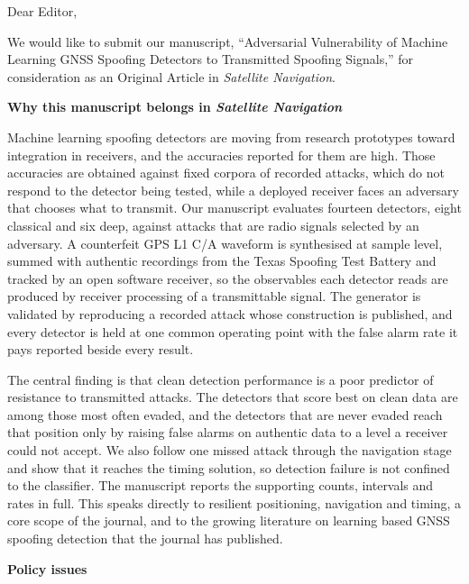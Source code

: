 \documentclass[11pt]{article}
\begin{document}
\noindent Dear Editor,

\vspace{1em}

\noindent We would like to submit our manuscript, ``Adversarial Vulnerability of Machine
Learning GNSS Spoofing Detectors to Transmitted Spoofing Signals,'' for consideration as an
Original Article in \emph{Satellite Navigation}.

\vspace{1em}
\noindent\textbf{Why this manuscript belongs in \emph{Satellite Navigation}}

\vspace{0.5em}

\noindent Machine learning spoofing detectors are moving from research prototypes toward
integration in receivers, and the accuracies reported for them are high. Those accuracies
are obtained against fixed corpora of recorded attacks, which do not respond to the
detector being tested, while a deployed receiver faces an adversary that chooses what to
transmit. Our manuscript evaluates fourteen detectors, eight classical and six deep,
against attacks that are radio signals selected by an adversary. A counterfeit GPS L1 C/A
waveform is synthesised at sample level, summed with authentic recordings from the Texas
Spoofing Test Battery and tracked by an open software receiver, so the observables each
detector reads are produced by receiver processing of a transmittable signal. The generator
is validated by reproducing a recorded attack whose construction is published, and every
detector is held at one common operating point with the false alarm rate it pays reported
beside every result.

The central finding is that clean detection performance is a poor predictor of resistance
to transmitted attacks. The detectors that score best on clean data are among those most
often evaded, and the detectors that are never evaded reach that position only by raising
false alarms on authentic data to a level a receiver could not accept. We also follow one
missed attack through the navigation stage and show that it reaches the timing solution,
so detection failure is not confined to the classifier. The manuscript reports the
supporting counts, intervals and rates in full. This speaks
directly to resilient positioning, navigation and timing, a core scope of the journal, and
to the growing literature on learning based GNSS spoofing detection that the journal has
published.

\vspace{1em}
\noindent\textbf{Policy issues}
\end{document}
